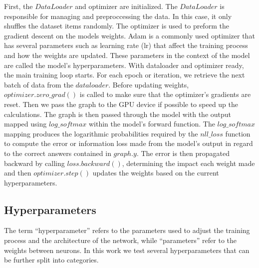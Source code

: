 First, the $DataLoader$ and optimizer are initialized. The $DataLoader$ is responsible for managing and preproccessing the data. In this case, it only shuffles the dataset items randomly. The optimizer is used to preform the gradient descent on the models weights. Adam \cite{ADAMIC2003211} is a commonly used optimizer that has several parameters such as learning rate (lr) that affect the training process and how the weights are updated. These parameters in the context of the model are called the model's hyperparameters. With dataloader and optimizer ready, the main training loop starts. For each epoch or iteration, we retrieve the next batch of data from the $dataloader$. Before updating weights, $optimizer.zero\_grad()$ is called to make sure that the optimizer's gradients are reset. Then we pass the graph to the GPU device if possible to speed up the calculations. The graph is then passed through the model with the output mapped using $log\_softmax$ within the model's forward function. The $log\_softmax$ mapping produces the logarithmic probabilities required by the $nll\_loss$ function to compute the error or information loss made from the model's output in regard to the correct answers contained in $graph.y$. The error is then propagated backward by calling $loss.backward()$, determining the impact each weight made and then $optimizer.step()$ updates the weights based on the current hyperparameters.

\subsection{Hyperparameters}

The term “hyperparameter” refers to the parameters used to adjust the training process and the architecture of the network, while “parameters” refer to the weights between neurons. In this work we test several hyperparameters that can be further split into categories.

